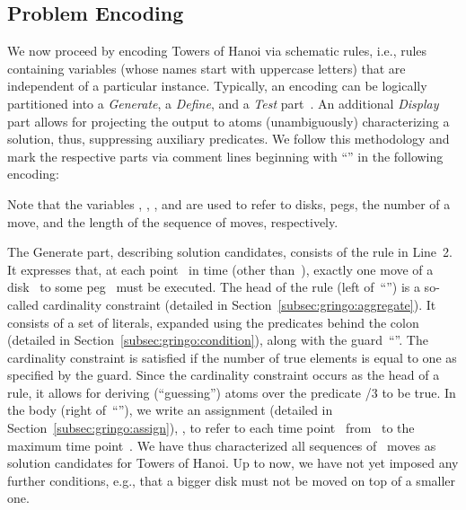 \subsection{Problem Encoding}

We now proceed by encoding Towers of Hanoi via schematic rules,
i.e., rules containing variables (whose names start with uppercase letters)
that are independent of a particular instance.
Typically, an encoding can be logically partitioned
into a \emph{Generate}, a \emph{Define}, and a \emph{Test} part~\cite{lifschitz02a}.
An additional \emph{Display} part allows for projecting
the output to atoms (unambiguously) characterizing a solution,
thus, suppressing auxiliary predicates.
We follow this methodology and
mark the respective parts via comment lines beginning with ``\code{\%}'' 
in the following encoding:%
%
%

%
Note that the variables , , , and  are used
to refer to disks, pegs, 
the number of a move, and the length of the sequence of moves, respectively.

The Generate part, describing solution candidates, consists of the rule in Line~2.
It expresses that,
at each point~ in time (other than~),
exactly one move of a disk~ to some peg~
must be executed.
The head of the rule (left of~``\code{:-}'')
is a so-called cardinality constraint (detailed in Section~\ref{subsec:gringo:aggregate}).
It consists of a set of literals,
expanded using the predicates behind the colon (detailed in Section~\ref{subsec:gringo:condition}),
along with the guard~``''.
The cardinality constraint is satisfied
if the number of true elements is equal to one as specified by the guard.
Since the cardinality constraint occurs as the head of a rule,
it allows for deriving (``guessing'') atoms 
over the predicate /$3$ to be true.
In the body (right of~``\code{:-}''),
we write an assignment (detailed in Section~\ref{subsec:gringo:assign}),
,
to refer to each time point~
from~ to the maximum time point~. %
We have thus characterized all sequences of~ moves
as solution candidates for Towers of Hanoi.
Up to now, 
we have not yet imposed any further conditions, e.g.,
that a bigger disk must not be moved on top of a smaller one.

